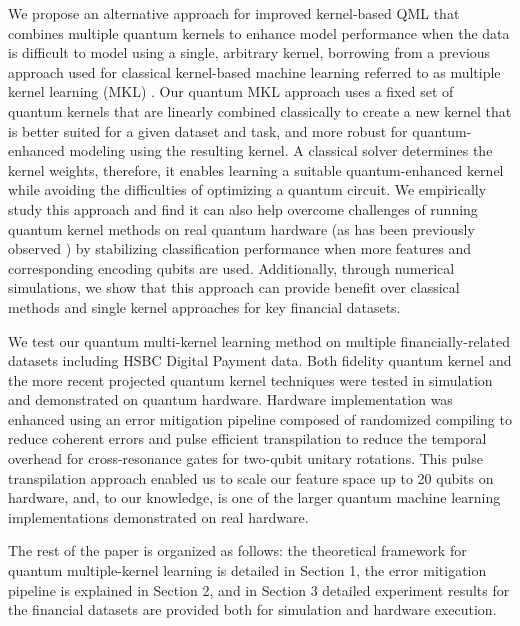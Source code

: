 \documentclass[reprint,amsfonts, amssymb, amsmath,  showkeys, nofootinbib,pra, superscriptaddress, twocolumn,longbibliography]{revtex4-2}
\newcommand{\todo}[1][TODO]{\textbf{\textcolor{red}{#1} }}
\begin{document}
We propose an alternative approach for improved kernel-based QML that combines multiple quantum kernels to enhance model performance when the data is difficult to model using a single, arbitrary kernel, borrowing from a previous approach used for classical kernel-based machine learning referred to as multiple kernel learning (MKL) \cite{JMLR:v13:cortes12a}. Our quantum MKL approach uses a fixed set of quantum kernels that are linearly combined classically to create a new kernel that is better suited for a given dataset and task, and more robust for quantum-enhanced modeling using the resulting kernel. A classical solver determines the kernel weights, therefore, it enables learning a suitable quantum-enhanced kernel while avoiding the difficulties of optimizing a quantum circuit. We empirically study this approach and find it can also help overcome challenges of running quantum kernel methods on real quantum hardware (as has been previously observed \cite{thanasilp2022exponential}) by stabilizing classification performance when more features and corresponding encoding qubits are used.  Additionally, through numerical simulations, we show that this approach can provide benefit over classical methods and single kernel approaches for key financial datasets.  

We test our quantum multi-kernel learning method on multiple financially-related datasets including HSBC Digital Payment data. Both fidelity quantum kernel \cite{havlivcek2019supervised} and the more recent projected quantum kernel \cite{Huang2021} techniques were tested in simulation and demonstrated on quantum hardware.  Hardware implementation was enhanced using an error mitigation pipeline composed of randomized compiling to reduce coherent errors and pulse efficient transpilation to reduce the temporal overhead for cross-resonance gates for two-qubit unitary rotations. This pulse transpilation approach enabled us to scale our feature space up to 20 qubits on hardware, and, to our knowledge, is one of the larger quantum machine learning implementations demonstrated on real hardware.

The rest of the paper is organized as follows: the theoretical framework for quantum multiple-kernel learning is detailed in Section 1, the error mitigation pipeline is explained in Section 2, and in Section 3 detailed experiment results for the financial datasets are provided both for simulation and hardware execution. 

\end{document}
